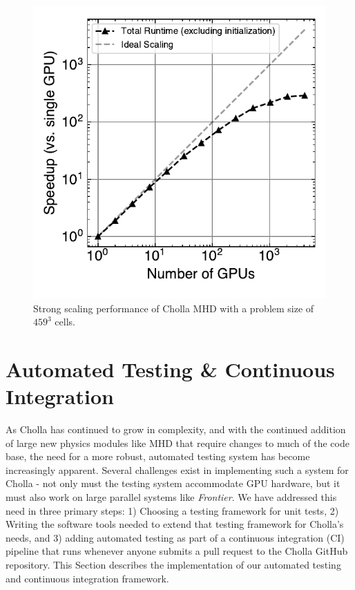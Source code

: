 \documentclass[modern, linenumbers]{aastex631}
\newcommand*{\img}[1]{%
    \raisebox{-.05\baselineskip}{%
        \texttt{[image: \#1]}%
    }%
}
\begin{document}
\begin{figure}[ht!]
    \centering
    \includegraphics{scaling_test_strong.pdf}
    \caption{Strong scaling performance of Cholla MHD with a problem size of $459^3$ cells. \href{https://zenodo.org/records/10927223}{\img{zenodo-gradient-200.png}}}
    \label{fig:scaling-strong}
\end{figure}

\section{Automated Testing \& Continuous Integration}
\label{sec:testing}

As Cholla has continued to grow in complexity, and with the continued addition of large new physics modules like MHD that require changes to much of the code base, the need for a more robust, automated testing system has become increasingly apparent. Several challenges exist in implementing such a system for Cholla - not only must the testing system accommodate GPU hardware, but it must also work on large parallel systems like \textit{Frontier}. We have addressed this need in three primary steps: 1) Choosing a testing framework for unit tests, 2) Writing the software tools needed to extend that testing framework for Cholla's needs, and 3) adding automated testing as part of a continuous integration (CI) pipeline that runs whenever anyone submits a pull request to the Cholla GitHub repository. This Section describes the implementation of our automated testing and continuous integration framework.
\end{document}
